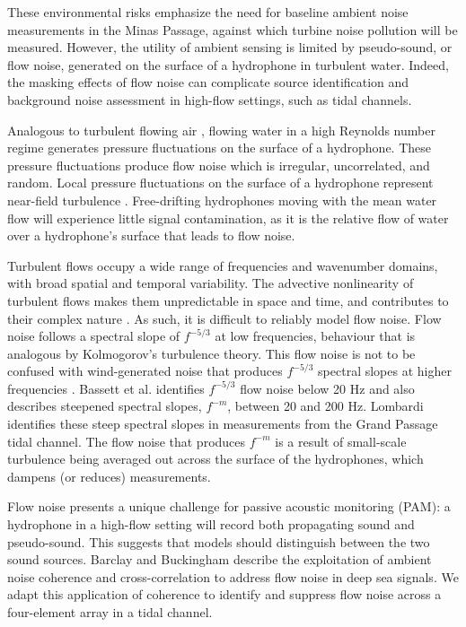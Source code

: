 \documentclass[12pt,journal,onecolumn]{IEEEtran}
\begin{document}
These environmental risks emphasize the need for baseline ambient noise measurements in the Minas Passage, against which turbine noise pollution will be measured. However, the utility of ambient sensing is limited by pseudo-sound, or flow noise, generated on the surface of a hydrophone in turbulent water. Indeed, the masking effects of flow noise can complicate source identification and background noise assessment in high-flow settings, such as tidal channels.

Analogous to turbulent flowing air \cite{light}, flowing water in a high Reynolds number regime generates pressure fluctuations on the surface of a hydrophone. These pressure fluctuations produce flow noise which is irregular, uncorrelated, and random. Local pressure fluctuations on the surface of a hydrophone represent near-field turbulence \cite{strasberg}. Free-drifting hydrophones moving with the mean water flow will experience little signal contamination, as it is the relative flow of water over a hydrophone's surface that leads to flow noise.  

Turbulent flows occupy a wide range of frequencies and wavenumber domains, with broad spatial and temporal variability. The advective nonlinearity %
of turbulent flows makes them unpredictable in space and time, and contributes to their complex nature \cite{van}. As such, it is difficult to reliably model flow noise. Flow noise follows a spectral slope of $f^{-5/3}$ at low frequencies, behaviour that is analogous by Kolmogorov's turbulence theory. This flow noise is not to be confused with wind-generated noise that produces $f^{-5/3}$ spectral slopes at higher frequencies \cite{knud}. Bassett et al. \cite{bassett} identifies $f^{-5/3}$ flow noise below 20 Hz and also describes steepened spectral slopes, $f^{-m}$, between 20 and 200 Hz. Lombardi \cite{lombardi} identifies these steep spectral slopes in measurements from the Grand Passage tidal channel. The flow noise that produces $f^{-m}$ is a result of small-scale turbulence being averaged out across the surface of the hydrophones, which dampens (or reduces) measurements.

Flow noise presents a unique challenge for passive acoustic monitoring (PAM): a hydrophone in a high-flow setting will record both propagating sound and pseudo-sound. This suggests that models  should distinguish between the two sound sources. Barclay and Buckingham \cite{barclaywind} describe the exploitation of ambient noise coherence and cross-correlation to address flow noise in deep sea signals. We adapt this application of coherence to identify and suppress flow noise across a four-element array in a tidal channel.  
\end{document}
